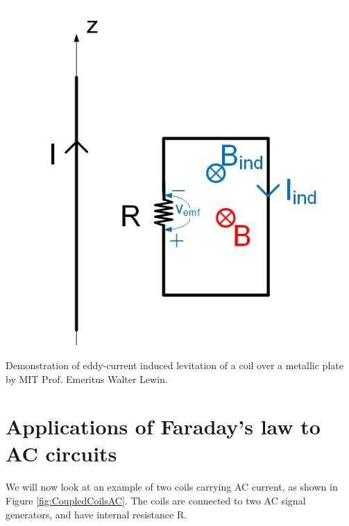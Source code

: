 \documentclass{ximera}
\begin{document}
\begin{example}
\begin{example}
\begin{figure}[htbp]
\begin{center}
\includegraphics[scale=0.5]{../jpg/Lenzlaw2.jpg}
\end{center}
\caption{}
\label{fig:LenzLaw2}
\end{figure}


\end{example}

\end{example}

\begin{example}
Demonstration of eddy-current induced levitation of a coil over a metallic plate by MIT Prof. Emeritus Walter Lewin.
\begin{center}  
\end{center} 
\end{example}


\newpage
\section{Applications of Faraday's law to AC circuits}


We will now look at an example of two coils carrying AC current, as shown in Figure \ref{fig:CoupledCoilsAC}. The coils are connected to two AC signal generators, and have internal resistance R. 
\end{document}
